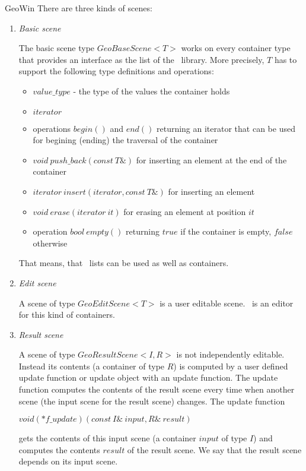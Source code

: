 \begin{ccRefClass}{GeoWin}
    There are three kinds of scenes:
    \begin{enumerate}
    
    \item {\em Basic scene}
    
    The basic scene  type $GeoBaseScene<T>$ works on  every 
    container type  that provides an interface as the list of the \stl\ library. 
    More precisely, $T$ has to support the following type definitions and operations:
    \begin{itemize}
    \item $value\_type$ - the type of the values the container holds
    \item $iterator$ 
    \item operations $begin()$ and $end()$ returning an iterator that can be used
          for begining (ending) the traversal of the container
    \item $void \ push\_back(const \ T\&)$ for inserting an element at the end of the container
    \item $iterator \ insert(iterator, const \ T\&)$ for inserting an element
    \item $void \ erase(iterator \ it)$ for erasing an element at position $it$
    \item operation $bool \ empty()$ returning $true$ if the container is empty, $false$
          otherwise    
    \end{itemize}
    
    That means, that \leda\ lists can be used as well as containers.

    \item {\em Edit scene}
    
    A scene of type $GeoEditScene<T>$ is a user editable scene.
    \ccRefName\ is an editor for this kind of containers.
    
    \item {\em Result scene}
    
    A scene of type $GeoResultScene<I,R>$ is not independently 
    editable. Instead its contents (a container of type $R$) is computed by a user
    defined update
    function or update object with an update function. The update function computes
    the contents of the result scene every time when another scene (the input scene for
    the result scene) changes. The update function
    
      $void (*f\_update)(const \ I\& \ input, R\& \ result)$
      
    gets the contents of this input scene (a container $input$ of type $I$) and computes
    the contents $result$ of the result scene.
    We say that the result scene depends on its input scene.
    

\end{enumerate}
\end{ccRefClass}
